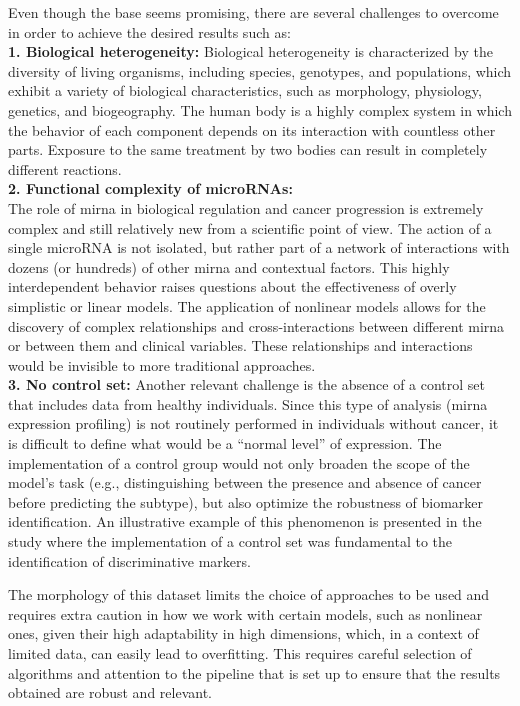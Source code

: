 Even though the base seems promising, there are several challenges to overcome
in order to achieve the desired results such as: \\ \textbf{1. Biological
  heterogeneity:} \label{sec:biological-heterogeneity} Biological heterogeneity
is characterized by the diversity of living organisms, including species,
genotypes, and populations, which exhibit a variety of biological
characteristics, such as morphology, physiology, genetics, and biogeography.
The human body is a highly complex system in which the behavior of each
component depends on its interaction with countless other parts. Exposure to
the same treatment by two bodies can result in completely different reactions.
\\ \textbf{2. Functional complexity of microRNAs:} \label{sec:mirna_complexity}
\\ The role of \gls{mirna} in biological regulation and cancer progression is
extremely complex and still relatively new from a scientific point of view. The
action of a single microRNA is not isolated, but rather part of a network of
interactions with dozens (or hundreds) of other \gls{mirna} and contextual
factors. This highly interdependent behavior raises questions about the
effectiveness of overly simplistic or linear models. The application of
nonlinear models allows for the discovery of complex relationships and
cross-interactions between different \gls{mirna} or between them and clinical
variables. These relationships and interactions would be invisible to more
traditional approaches. \\ \textbf{3. No control set:} Another relevant
challenge is the absence of a control set that includes data from healthy
individuals. Since this type of analysis (\gls{mirna} expression profiling) is
not routinely performed in individuals without cancer, it is difficult to
define what would be a “normal level” of expression. The implementation of a
control group would not only broaden the scope of the model's task (e.g.,
distinguishing between the presence and absence of cancer before predicting the
subtype), but also optimize the robustness of biomarker identification. An
illustrative example of this phenomenon is presented in the study
\textcite{ml_gastric_Azari2023} where the implementation of a control set was
fundamental to the identification of discriminative markers.

The morphology of this dataset limits the choice of approaches to be used and
requires extra caution in how we work with certain models, such as nonlinear
ones, given their high adaptability in high dimensions, which, in a context of
limited data, can easily lead to overfitting. This requires careful selection
of algorithms and attention to the pipeline that is set up to ensure that the
results obtained are robust and relevant.

